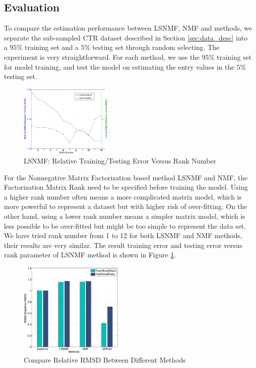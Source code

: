 \subsection{Evaluation}
To compare the estimation performance between LSNMF, NMF and {\sppan}
methods, we separate the sub-sampled CTR dataset described in Section
\ref{sec:data_desc} into a $95\%$ training set and a $5\%$ testing set
through random selecting. The experiment is very straightforward. For
each method, we use the $95\%$ training set for model training, and
test the model on estimating the entry values in the $5\%$ testing
set.

\begin{figure}[!ht]
  \centering
  \includegraphics[width=0.4\textwidth]{figures/learning_curve_lsnmf_subsample_relative.eps}
  \caption{LSNMF: Relative Training/Testing Error Versus Rank Number}
  \label{fig:lsnmf_learning}
\end{figure}

For the Nonnegative Matrix Factorization based method LSNMF and NMF,
the Factorization Matrix Rank need to be specified before training the
model. Using a higher rank number often means a more complicated
matrix model, which is more powerful to represent a dataset but with
higher risk of over-fitting. On the other hand, using a lower rank
number means a simpler matrix model, which is less possible to be
over-fitted but might be too simple to represent the data set. We have
tried rank number from 1 to 12 for both LSNMF and NMF methods, their
results are very similar. The result training error and testing error
versus rank parameter of LSNMF method is shown in Figure
\ref{fig:lsnmf_learning}.

\begin{figure}[!ht]
  \centering
  \includegraphics[width=0.45\textwidth]{figures/methos_comparison_all_relative.eps}
  \caption{Compare Relative RMSD Between Different Methods}
  \label{fig:rmsd_compare}
\end{figure}

